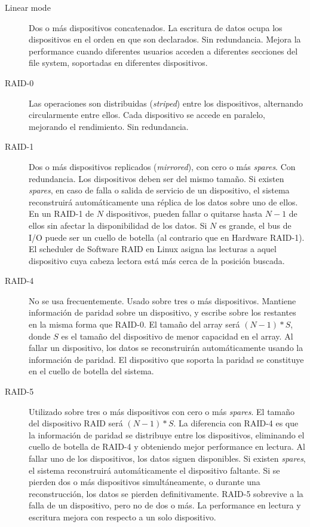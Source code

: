 \begin{description}
	\item [Linear mode] Dos o más dispositivos concatenados. La escritura de datos ocupa los dispositivos en el orden en que son declarados. 
Sin redundancia.
Mejora la performance cuando diferentes usuarios acceden a diferentes secciones del file system, soportadas en diferentes dispositivos.
	\item [RAID-0] Las operaciones son distribuidas (\emph{striped}) entre los dispositivos, alternando circularmente entre ellos. Cada dispositivo se accede en paralelo, mejorando el rendimiento. Sin redundancia. 
	\item [RAID-1]
Dos o más dispositivos replicados (\emph{mirrored}), con cero o más \emph{spares}. 
Con redundancia. Los dispositivos deben ser del mismo tamaño. Si existen \emph{spares}, en caso de falla o salida de servicio de un dispositivo, el sistema reconstruirá automáticamente una réplica de los datos sobre uno de ellos. 
En un RAID-1 de $N$ dispositivos, pueden fallar o quitarse hasta $N-1$ de ellos sin afectar la disponibilidad de los datos. 
Si $N$ es grande, el bus de I/O puede ser un cuello de botella (al contrario que en Hardware RAID-1). El scheduler de Software RAID en Linux asigna las lecturas a aquel dispositivo cuya cabeza lectora está más cerca de la posición buscada. 
	\item [RAID-4] No se usa frecuentemente. Usado sobre tres o más dispositivos. Mantiene información de paridad sobre un dispositivo, y escribe sobre los restantes en la misma forma que RAID-0. El tamaño del array será $(N-1)*S$, donde $S$ es el tamaño del dispositivo de menor capacidad en el array. 
Al fallar un dispositivo, los datos se reconstruirán automáticamente usando la información de paridad. El dispositivo que soporta la paridad se constituye en el cuello de botella del sistema. 


\item [RAID-5]
Utilizado sobre tres o más dispositivos con cero o más \emph{spares}. El tamaño del dispositivo RAID será $(N-1)*S$. La diferencia con RAID-4 es que la información de paridad se distribuye entre los dispositivos, eliminando el cuello de botella de RAID-4 y obteniendo mejor performance en lectura. Al fallar uno de los dispositivos, los datos siguen disponibles. Si existen \emph{spares}, el sistema reconstruirá automáticamente el dispositivo faltante. Si se pierden dos o más dispositivos simultáneamente, o durante una reconstrucción, los datos se pierden definitivamente. RAID-5 sobrevive a la falla de un dispositivo, pero no de dos o más. 
La performance en lectura y escritura mejora con respecto a un solo dispositivo. 


\end{description}
